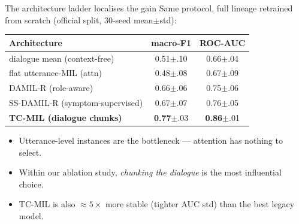 \documentclass[10pt,aspectratio=169]{beamer}
\newcommand{\good}[1]{\textcolor{mGood}{#1}}
\newcommand{\bad}[1]{\textcolor{mWarn}{#1}}
\newcommand{\num}[1]{\textbf{#1}}
\begin{document}
\begin{frame}{The architecture ladder localises the gain}
  Same protocol, full lineage retrained from scratch (official split, 30-seed mean$\pm$std):
  \begin{table}
    \centering\small
    \begin{tabular}{@{}lcc@{}}
      \toprule
      \textbf{Architecture} & \textbf{macro-F1} & \textbf{ROC-AUC} \\
      \midrule
      dialogue mean (context-free) & 0.51{\footnotesize$\pm$.10} & 0.66{\footnotesize$\pm$.04} \\
      flat utterance-MIL (attn)    & 0.48{\footnotesize$\pm$.08} & 0.67{\footnotesize$\pm$.09} \\
      DAMIL-R (role-aware)         & 0.66{\footnotesize$\pm$.06} & 0.75{\footnotesize$\pm$.06} \\
      SS-DAMIL-R (symptom-supervised) & 0.67{\footnotesize$\pm$.07} & 0.76{\footnotesize$\pm$.05} \\
      \midrule
      \textbf{TC-MIL (dialogue chunks)} & \good{\num{0.77}}{\footnotesize$\pm$.03} & \good{\num{0.86}}{\footnotesize$\pm$.01} \\
      \bottomrule
    \end{tabular}
  \end{table}
  \begin{itemize}
    \item Utterance-level instances are \bad{the bottleneck} --- attention has nothing to select.
    \item Within our ablation study, \emph{chunking the dialogue} is the most influential choice.
    \item TC-MIL is also $\approx\!5\times$ more stable (tighter AUC std) than the best legacy model.
  \end{itemize}
\end{frame}
\end{document}
